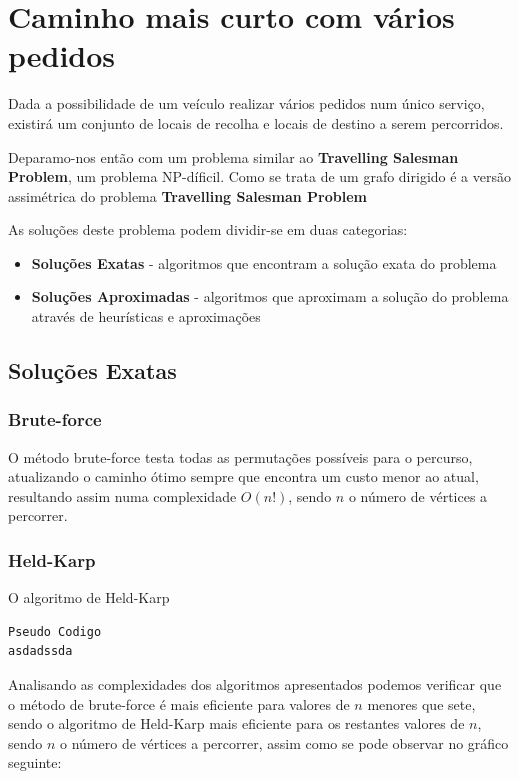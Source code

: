 \documentclass[article, a4paper, 12pt, oneside]{memoir}
\begin{document}
\section{Caminho mais curto com vários pedidos}
Dada a possibilidade de um veículo realizar vários pedidos num único serviço, existirá um conjunto de locais de recolha e locais de destino a serem percorridos.

Deparamo-nos então com um problema similar ao \textbf{Travelling Salesman Problem}, um problema NP-díficil. Como se trata de um grafo dirigido é a versão assimétrica do problema \textbf{Travelling Salesman Problem}

As soluções deste problema podem dividir-se em duas categorias:
\begin{itemize}
	\item \textbf{Soluções Exatas} - algoritmos que encontram a solução exata do problema
	\item \textbf{Soluções Aproximadas} - algoritmos que aproximam a solução do problema através de heurísticas e aproximações
\end{itemize}

\subsection{Soluções Exatas}
\subsubsection{Brute-force}
O método brute-force testa todas as permutações possíveis para o percurso, atualizando o caminho ótimo sempre que encontra um custo menor ao atual, resultando assim numa complexidade $O(n!)$, sendo $n$ o número de vértices a percorrer.

\subsubsection{Held-Karp}

O algoritmo de Held-Karp

\begin{lstlisting}[frame=single, mathescape=true]
Pseudo Codigo
asdadssda
\end{lstlisting}

Analisando as complexidades dos algoritmos apresentados podemos verificar que o método de brute-force é mais eficiente para valores de $n$ menores que sete, sendo o algoritmo de Held-Karp mais eficiente para os restantes valores de $n$, sendo $n$ o número de vértices a percorrer, assim como se pode observar no gráfico seguinte:
\end{document}
